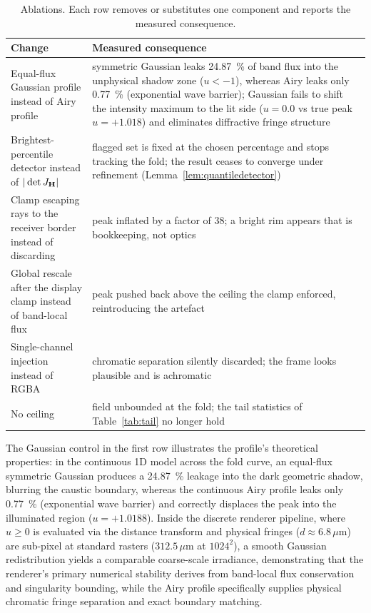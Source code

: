 \begin{table}[tp]
\centering
\caption{Ablations. Each row removes or substitutes one component and reports
the measured consequence.}
\label{tab:ablation}
\small
\begin{tabular*}{\textwidth}{@{\extracolsep{\fill}}p{}p{}@{}}
\toprule
Change & Measured consequence \\
\midrule
Equal-flux Gaussian profile instead of Airy profile &
symmetric Gaussian leaks \SI{24.87}{\percent} of band flux into the unphysical shadow zone ($u < -1$), whereas Airy leaks only \SI{0.77}{\percent} (exponential wave barrier); Gaussian fails to shift the intensity maximum to the lit side ($u = 0.0$ vs true peak $u = +1.018$) and eliminates diffractive fringe structure \\
\addlinespace
Brightest-percentile detector instead of $|\det J_{\mathbf{H}}|$ &
flagged set is fixed at the chosen percentage and stops tracking the fold; the
result ceases to converge under refinement (Lemma~\ref{lem:quantiledetector}) \\
\addlinespace
Clamp escaping rays to the receiver border instead of discarding &
peak inflated by a factor of \num{38}; a bright rim appears that is bookkeeping,
not optics \\
\addlinespace
Global rescale after the display clamp instead of band-local flux &
peak pushed back above the ceiling the clamp enforced, reintroducing the
artefact \\
\addlinespace
Single-channel injection instead of RGBA &
chromatic separation silently discarded; the frame looks plausible and is
achromatic \\
\addlinespace
No ceiling &
field unbounded at the fold; the tail statistics of Table~\ref{tab:tail} no
longer hold \\
\bottomrule
\end{tabular*}
\end{table}

The Gaussian control in the first row illustrates the profile's theoretical properties:
in the continuous 1D model across the fold curve, an equal-flux symmetric Gaussian produces
a \SI{24.87}{\percent} leakage into the dark geometric shadow, blurring the caustic boundary,
whereas the continuous Airy profile leaks only \SI{0.77}{\percent} (exponential wave barrier)
and correctly displaces the peak into the illuminated region ($u = +1.0188$).
Inside the discrete renderer pipeline, where $u \ge 0$ is evaluated via the distance transform
and physical fringes ($d \approx 6.8\,\mu\text{m}$) are sub-pixel at standard rasters ($312.5\,\mu\text{m}$ at $1024^2$),
a smooth Gaussian redistribution yields a comparable coarse-scale irradiance, demonstrating
that the renderer's primary numerical stability derives from band-local flux conservation and
singularity bounding, while the Airy profile specifically supplies physical chromatic fringe
separation and exact boundary matching.

